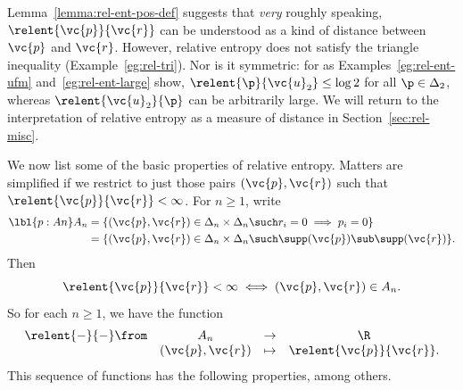 Lemma~\ref{lemma:rel-ent-pos-def} suggests that \emph{very} roughly
speaking, $\relent{\vc{p}}{\vc{r}}$ can be understood as a kind of
distance%
% 
% 
between $\vc{p}$ and $\vc{r}$.  However, relative entropy does not satisfy
the triangle inequality (Example~\ref{eg:rel-tri}).  Nor is it symmetric:%
% 
% 
for as Examples~\ref{eg:rel-ent-ufm} and~\ref{eg:rel-ent-large} show,
$\relent{\p}{\vc{u}_2} \leq \log 2$ for all $\p \in \Delta_2$, whereas
$\relent{\vc{u}_2}{\p}$ can be arbitrarily large.  We will return to the
interpretation of relative entropy as a measure of distance in
Section~\ref{sec:rel-misc}.

We now list some of the basic properties of relative entropy.  Matters are
simplified if we restrict to just those pairs $(\vc{p}, \vc{r})$ such that
$\relent{\vc{p}}{\vc{r}} < \infty$.  For $n \geq 1$, write
% 
\begin{align*}
\lbl{p:An}
A_n     &
=
\{ (\vc{p}, \vc{r}) \in \Delta_n \times \Delta_n \such
r_i = 0 \implies p_i = 0 \}     \\
&
=
\{ (\vc{p}, \vc{r}) \in \Delta_n \times \Delta_n \such
\supp(\vc{p}) \sub \supp(\vc{r}) \}.
\end{align*}
% 
Then 
\[
\relent{\vc{p}}{\vc{r}} < \infty \iff (\vc{p}, \vc{r}) \in A_n.  
\]
So for each $n \geq 1$, we have the function
% 
\begin{equation*}
\begin{array}[c]{cccc}
\relent{-}{-}\from      &A_n            &\to    &\R    \\
                        &(\vc{p}, \vc{r})&\mapsto&\relent{\vc{p}}{\vc{r}}.
\end{array}
\end{equation*}
% 
This sequence of functions has the following properties, among others.
% 
